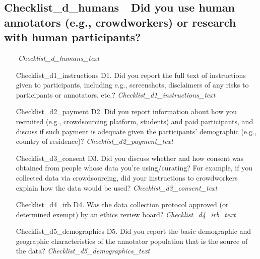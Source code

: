 \documentclass[11pt]{article}
\begin{document}
\subsection{{{Checklist_d_humans}}\ \ Did you use human annotators (e.g., crowdworkers) or research with human participants?}
\ \ \ \ \textit{{{Checklist_d_humans_text}}}
\begin{itemize}
    \item[{{Checklist_d1_instructions}}] D1. Did you report the full text of instructions given to participants, including e.g., screenshots, disclaimers of any risks to participants or annotators, etc.?
    \newline\textit{{{Checklist_d1_instructions_text}}}
    \item[{{Checklist_d2_payment}}] D2. Did you report information about how you recruited (e.g., crowdsourcing platform, students) and paid participants, and discuss if such payment is adequate given the participants’ demographic (e.g., country of residence)?
    \newline\textit{{{Checklist_d2_payment_text}}}
    \item[{{Checklist_d3_consent}}] D3. Did you discuss whether and how consent was obtained from people whose data you’re using/curating? For example, if you collected data via crowdsourcing, did your instructions to crowdworkers explain how the data would be used?
    \newline\textit{{{Checklist_d3_consent_text}}}
    \item[{{Checklist_d4_irb}}] D4. Was the data collection protocol approved (or determined exempt) by an ethics review board?
    \newline\textit{{{Checklist_d4_irb_text}}}
    \item[{{Checklist_d5_demographics}}] D5. Did you report the basic demographic and geographic characteristics of the annotator population that is the source of the data?
    \newline\textit{{{Checklist_d5_demographics_text}}}
\end{itemize}
\end{document}
